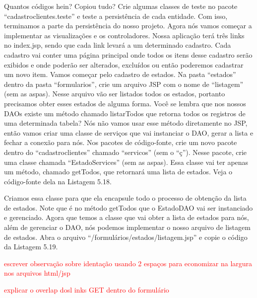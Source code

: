 Quantos códigos hein? Copiou tudo? Crie algumas classes de teste no pacote ``cadastroclientes.teste'' e teste a persistência de cada entidade. Com isso, terminamos a parte da persistência do nosso projeto.
Agora nós vamos começar a implementar as visualizações e os controladores. Nossa aplicação terá três links no index.jsp, sendo que cada link levará a um determinado cadastro. Cada cadastro vai conter uma página principal onde todos os itens desse cadastro serão exibidos e onde poderão ser alterados, excluídos ou então poderemos cadastrar um novo item.
Vamos começar pelo cadastro de estados. Na pasta ``estados'' dentro da pasta ``formularios'', crie um arquivo JSP com o nome de ``listagem'' (sem as aspas). Nesse arquivo vão ser listados todos os estados, portanto precisamos obter esses estados de alguma forma. Você se lembra que nos nossos DAOs existe um método chamado listarTodos que retorna todos os registros de uma determinada tabela? Nós não vamos usar esse método diretamente no JSP, então vamos criar uma classe de serviços que vai instanciar o DAO, gerar a lista e fechar a conexão para nós. Nos pacotes de código-fonte, crie um novo pacote dentro do ``cadastroclientes'' chamado ``servicos'' (sem o ``ç''). Nesse pacote, crie uma classe chamada ``EstadoServices'' (sem as aspas). Essa classe vai ter apenas um método, chamado getTodos, que retornará uma lista de estados. Veja o código-fonte dela na Listagem 5.18.


Criamos essa classe para que ela encapsule todo o processo de obtenção da lista de estados. Note que é no método getTodos que o EstadoDAO vai ser instanciado e gerenciado.
Agora que temos a classe que vai obter a lista de estados para nós, além de gerenciar o DAO, nós podemos implementar o nosso arquivo de listagem de estados. Abra o arquivo ``/formulários/estados/listagem.jsp'' e copie o código da Listagem 5.19.

\textcolor{red}{escrever observação sobre identação usando 2 espaços para economizar na largura nos arquivos html/jsp}

\textcolor{red}{explicar o overlap dosl inks GET dentro do formulário}


